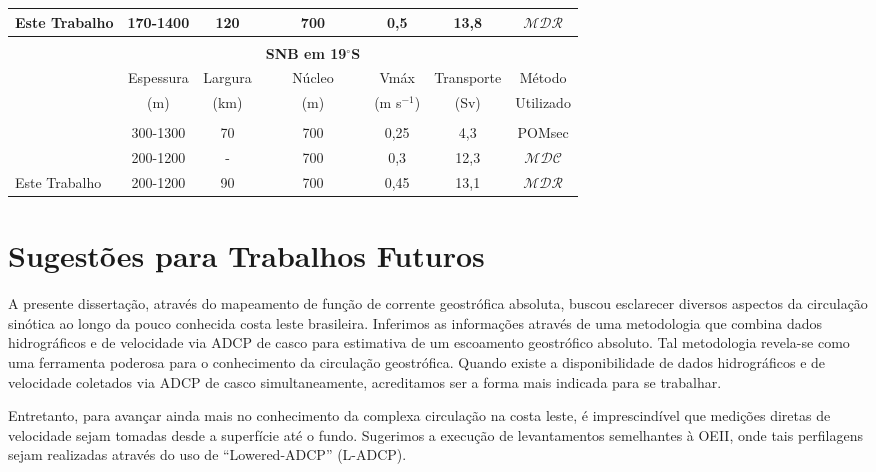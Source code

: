 \begin{table}
\begin{center}
\begin{sideways}
\begin{tabular}{|lcccccc|}
Este Trabalho  & 170-1400 & 120 & 700 & 0,5 & 13,8 & $\mathcal{MDR}$ \vspace{0.1cm} \\
\hline
 & & & & & &\vspace{-0.4cm} \\
 & & & {\bf SNB em 19$^\circ$S} & & & \\  
& Espessura & Largura  & Núcleo & Vmáx & Transporte & Método \vspace{-0.1cm} \\
& (m) & (km) & (m) & (m s$^{-1}$) & (Sv) & Utilizado\\
\hline 
 & & & & & &\vspace{-0.4cm} \\
\cite{soutelino2005}  & 300-1300 & 70 & 700 & 0,25 & 4,3 & POMsec \vspace{0.1cm} \\
\cite{silveira_etal2006B}  & 200-1200 & - & 700 & 0,3  & 12,3 &  $\mathcal{MDC}$ \vspace{0.1cm} \\
Este Trabalho  & 200-1200 & 90 & 700 & 0,45 & 13,1 & $\mathcal{MDR}$ \vspace{0.1cm} \\
\hline
\end{tabular}
\end{sideways}
\end{center}
\end{table}


\newpage

\section{Sugestões para Trabalhos Futuros}\label{sec:trab_fut}

\hspace{6mm} A presente dissertação, através do mapeamento de função de corrente geostrófica absoluta, 
buscou esclarecer diversos aspectos da circulação sinótica ao longo da pouco conhecida costa leste brasileira. 
Inferimos as informações através de uma metodologia que combina dados hidrográficos e de 
velocidade via ADCP de casco para estimativa de um escoamento geostrófico absoluto. Tal metodologia revela-se
como uma ferramenta poderosa para o conhecimento da circulação geostrófica. Quando existe 
a disponibilidade de dados hidrográficos e de velocidade coletados via ADCP de casco simultaneamente, acreditamos
ser a forma mais indicada para se trabalhar. 

Entretanto, para avançar ainda mais no conhecimento da complexa circulação na costa leste, 
é imprescindível que medições diretas de velocidade sejam tomadas desde a superfície até o fundo.
Sugerimos a execução de levantamentos semelhantes à OEII, onde tais perfilagens sejam realizadas através
do uso de ``Lowered-ADCP'' (L-ADCP). 


